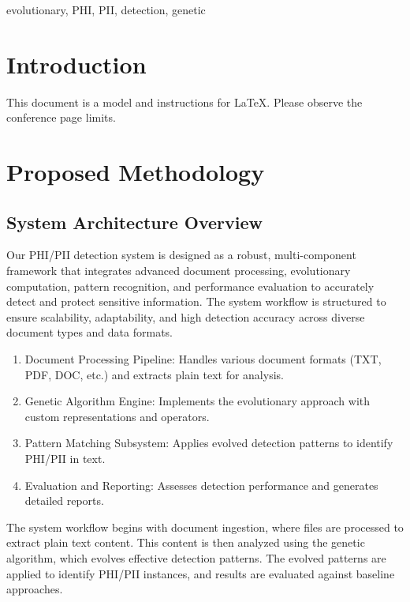 \documentclass[conference]{IEEEtran}
\begin{document}
\begin{IEEEkeywords}
evolutionary, PHI, PII, detection, genetic
\end{IEEEkeywords}

\section{Introduction}
This document is a model and instructions for \LaTeX.
Please observe the conference page limits.

\section{\textbf{Proposed Methodology}}

\subsection{\textbf{System Architecture Overview}}

Our PHI/PII detection system is designed as a robust, multi-component framework that integrates advanced document processing, evolutionary computation, pattern recognition, and performance evaluation to accurately detect and protect sensitive information. The system workflow is structured to ensure scalability, adaptability, and high detection accuracy across diverse document types and data formats.
\begin{enumerate}
\item Document Processing Pipeline: Handles various document formats (TXT, PDF, DOC, etc.) and extracts plain text for analysis.

\item Genetic Algorithm Engine: Implements the evolutionary approach with custom representations and operators.

\item  Pattern Matching Subsystem: Applies evolved detection patterns to identify PHI/PII in text.

\item Evaluation and Reporting: Assesses detection performance and generates detailed reports.
\end{enumerate}

The system workflow begins with document ingestion, where files are processed to extract plain text content. This content is then analyzed using the genetic algorithm, which evolves effective detection patterns. The evolved patterns are applied to identify PHI/PII instances, and results are evaluated against baseline approaches.
\end{document}

